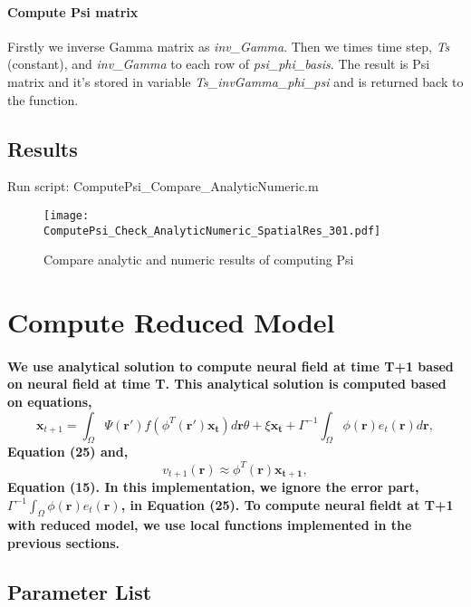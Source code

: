 \documentclass[a4paper, 12pt, english]{article}
\begin{document}
\paragraph{Compute Psi matrix\newline}
Firstly we inverse Gamma matrix as \textit{inv\_Gamma}. Then we times time step, \textit{Ts} (constant), and \textit{inv\_Gamma} to each row of \textit{psi\_phi\_basis}.
The result is Psi matrix and it's stored in variable \textit{Ts\_invGamma\_phi\_psi} and is returned back to the function.

\subsection{Results}
Run script: ComputePsi\_Compare\_AnalyticNumeric.m
\begin{figure}[H]
\centering
\texttt{[image: ComputePsi\_Check\_AnalyticNumeric\_SpatialRes\_301.pdf]}
\caption{Compare analytic and numeric results of computing Psi}
\end{figure}
\newpage




\section{Compute Reduced Model}

\paragraph{We use analytical solution to compute neural field at time T+1 based on
neural field at time T.\newline
This analytical solution is computed based on equations,
$$\boldsymbol{x}_{t+1}=\int_{\Omega}\Psi(\boldsymbol{r}\prime)f(\phi^{T}(\boldsymbol{r\prime})\boldsymbol{x_t})d\boldsymbol{r}\theta + \xi\boldsymbol{x_t} + \Gamma^{-1}\int_{\Omega}\phi(\boldsymbol{r})e_t(\boldsymbol{r})d\boldsymbol{r},$$
Equation (25) and,
$$v_{t+1}(\boldsymbol{r})\approx\phi^T(\boldsymbol{r})\boldsymbol{x_{t+1}}, $$
Equation (15).\newline
In this implementation, we ignore the error part, $\Gamma^{-1}\int_{\Omega}\phi(\boldsymbol{r})e_t(\boldsymbol{r})$, in Equation (25).\newline
To compute neural fieldt at T+1 with reduced model, we use local functions implemented in the previous sections.
}

\subsection{Parameter List}
\end{document}

